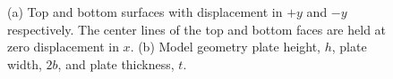 \begin{figure}%
    \centering
    \qquad
    \caption{(a) Top and bottom surfaces with displacement in $+y$ and $-y$ respectively. The center lines of the top and bottom faces are held at zero displacement in $x$. (b) Model geometry plate height, $h$, plate width, $2b$, and plate thickness, $t$.}%
    \label{fig:model_params}%
\end{figure}
	
 
